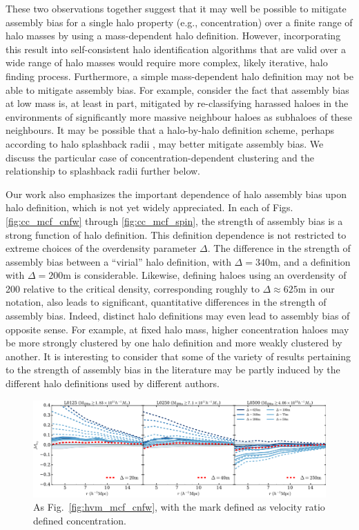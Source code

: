 \documentclass[usenatbib,fleqn]{mnras}
\begin{document}
These two observations together suggest that it may well be possible to mitigate assembly bias for a single halo property (e.g., concentration) over a finite range of halo masses by using a mass-dependent halo definition. However, incorporating this result into self-consistent halo identification algorithms that are valid over a wide range of halo masses would require more complex, likely iterative, halo finding process. Furthermore, a simple mass-dependent halo definition may not be able to mitigate assembly bias. For example, consider the fact that assembly bias at low mass is, at least in part, mitigated by re-classifying harassed haloes in the environments of significantly more massive neighbour haloes as subhaloes of these neighbours. It may be possible that a halo-by-halo definition scheme, perhaps according to halo splashback radii \citep{diemer_kravtsov14,diemer_kravtsov15,mansfield_etal16,diemer_etal17}, may better mitigate assembly bias. We discuss the particular case of concentration-dependent clustering and the relationship to splashback radii further below.

Our work also emphasizes the important dependence of halo assembly bias upon halo definition, which is not yet widely appreciated. In each of Figs. \ref{fig:cc_mcf_cnfw} through \ref{fig:cc_mcf_spin}, the strength of assembly bias is a strong function of halo definition. This definition dependence is not restricted to extreme choices of the overdensity parameter $\Delta$. The difference in the strength of assembly bias between a ``virial'' halo definition, with $\Delta=340$m, and a definition with $\Delta=200$m is considerable. Likewise, defining haloes using an overdensity of 200 relative to the critical density, corresponding roughly to $\Delta \approx 625$m in our notation, also leads to significant, quantitative differences in the strength of assembly bias. Indeed, distinct halo definitions may even lead to assembly bias of opposite sense. For example, at fixed halo mass, higher concentration haloes may be more strongly clustered by one halo definition and more weakly clustered by another. It is interesting to consider that some of the variety of results pertaining to the strength of assembly bias in the literature may be partly induced by the different halo definitions used by different authors.

\begin{figure}
	\centering
	\includegraphics[width=\textwidth]{match_mcf_cV.pdf}
	\caption{As Fig.~\ref{fig:hvm_mcf_cnfw}, with the mark defined as velocity ratio defined concentration.
}
	\label{fig:hvm_mcf_cV}
\end{figure}
\end{document}

